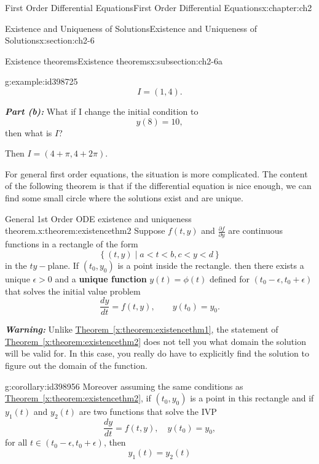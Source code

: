 \documentclass[oneside,10pt,]{book}
\newcommand{\xreffont}{\relax}
\newcommand{\alert}[1]{\textbf{\textit{#1}}}
\newcommand{\terminology}[1]{\textbf{#1}}
\numberwithin{equation}{section}
\numberwithin{equation}{section}
\newcommand{\lt}{<}
\begin{document}
\begin{chapterptx}{First Order Differential Equations}{}{First Order Differential Equations}{}{}{x:chapter:ch2}
\begin{sectionptx}{Existence and Uniqueness of Solutions}{}{Existence and Uniqueness of Solutions}{}{}{x:section:ch2-6}
\begin{subsectionptx}{Existence theorems}{}{Existence theorems}{}{}{x:subsection:ch2-6a}
\begin{example}{}{g:example:id398725}
\begin{equation*}
I=(1,4).
\end{equation*}
%
\par
\alert{Part (b):} What if I change the initial condition to%
\begin{equation*}
y(8)=10,
\end{equation*}
then what is \(I\)?%
\par
Then \(I=\left(4+\pi,4+2\pi\right)\).%
\end{example}
For general first order equations, the situation is more complicated. The content of the following theorem is that if the differential equation is nice enough, we can find some small circle where the solutions exist and are unique.%
\begin{theorem}{General 1st Order ODE existence and uniqueness theorem.}{}{x:theorem:existencethm2}%
Suppose \(f(t,y)\) and \(\frac{\partial f}{\partial y}\) are continuous functions in a rectangle of the form%
\begin{equation*}
\left\{ \left(t,y\right)\mid a\lt t\lt b,c \lt y \lt d\right\}
\end{equation*}
in the \(ty-\)plane. If \((t_{0},y_{0})\) is a point inside the rectangle. then there exists a unique \(\epsilon>0\) and a \terminology{unique function} \(y(t)=\phi(t)\) defined for \(\left(t_{0}-\epsilon,t_{0}+\epsilon\right)\) that solves the initial value problem%
\begin{equation*}
\frac{dy}{dt}=f(t,y),\qquad y(t_{0})=y_{0}.
\end{equation*}
%
\end{theorem}
\alert{Warning:} Unlike \hyperref[x:theorem:existencethm1]{Theorem~{\xreffont\ref{x:theorem:existencethm1}}}, the statement of \hyperref[x:theorem:existencethm2]{Theorem~{\xreffont\ref{x:theorem:existencethm2}}} does not tell you what domain the solution will be valid for. In this case, you really do have to explicitly find the solution to figure out the domain of the function.%
\begin{corollary}{}{}{g:corollary:id398956}%
Moreover assuming the same conditions as  \hyperref[x:theorem:existencethm2]{Theorem~{\xreffont\ref{x:theorem:existencethm2}}}, if \((t_{0},y_{0})\) is a point in this rectangle and if \(y_{1}(t)\) and \(y_{2}(t)\) are two functions that solve the IVP%
\begin{equation*}
\frac{dy}{dt}=f(t,y),\quad y(t_{0})=y_{0},
\end{equation*}
for all \(t\in\left(t_{0}-\epsilon,t_{0}+\epsilon\right)\), then%
\begin{equation*}
y_{1}(t)=y_{2}(t)

\end{equation*}
\end{corollary}
\end{subsectionptx}
\end{sectionptx}
\end{chapterptx}
\end{document}
